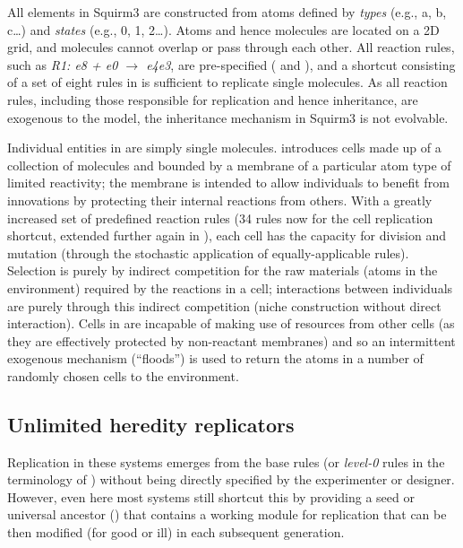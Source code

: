All elements in Squirm3 are constructed from atoms defined by \emph{types} (e.g., a, b, c\dots) and \emph{states} (e.g., 0, 1, 2\dots). Atoms and hence molecules are located on a 2D grid, and molecules cannot overlap or pass through each other. All reaction rules, such as \emph{R1: e8 + e0 $\rightarrow$ e4e3}, are pre-specified (\textcite[p.4]{Hutton2007} and \textcite[p.49]{Faulconbridge2011}), and a shortcut consisting of a set of eight rules in \textcite{Hutton2002} is sufficient to replicate single molecules. As all reaction rules, including those responsible for replication and hence inheritance, are exogenous to the model, the inheritance mechanism in Squirm3 is not evolvable. 

Individual entities in \textcite{Hutton2002} are simply single molecules. \Textcite{Hutton2007} introduces cells made up of a collection of molecules and bounded by a membrane of a particular atom type of limited reactivity; the membrane is intended to allow individuals to benefit from innovations by protecting their internal reactions from others. With a greatly increased set of predefined reaction rules (34 rules now for the cell replication shortcut, extended further again in \textcite{Lucht2012}), each cell has the capacity for division and mutation (through the stochastic application of equally-applicable rules).  Selection is purely by indirect competition for the raw materials (atoms in the environment) required by the reactions in a cell; interactions between individuals are purely through this indirect competition (niche construction without direct interaction). Cells in \textcite{Hutton2007} are incapable of making use of resources from other cells (as they are effectively protected by non-reactant membranes) and so an intermittent exogenous mechanism (``floods'') is used to return the atoms in a number of randomly chosen cells to the environment.

\subsection{Unlimited heredity replicators}
Replication in these systems emerges from the base rules (or \textit{level-0} rules in the terminology of \textcite{BanzhafBaumgaertnerBeslonEtAl2016}) without being directly specified by the experimenter or designer. However, even here most systems still shortcut this by providing a seed or universal ancestor (\eg \textcite{Ofria2004}) that contains a working module for replication that can be then modified (for good or ill) in each subsequent generation.

